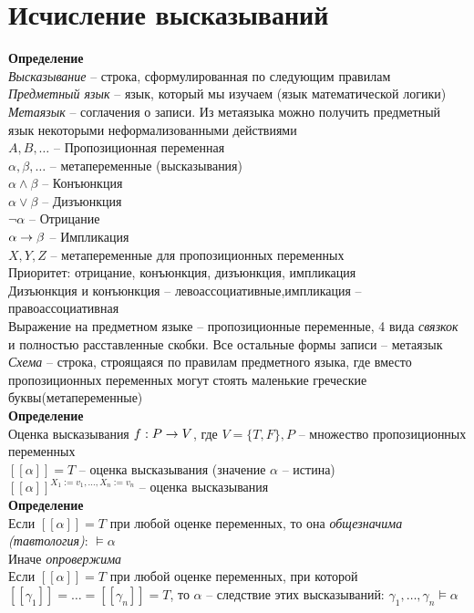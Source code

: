 \documentclass[12pt]{article}
\begin{document}
\section{Исчисление высказываний}
\textbf{Определение}\\
\textit{Высказывание} -- строка, сформулированная по следующим правилам\\
\textit{Предметный язык} -- язык, который мы изучаем (язык математической логики)\\
\textit{Метаязык} -- соглачения о записи. Из метаязыка можно получить предметный язык некоторыми неформализованными действиями\\
$A, B, \ldots$ -- Пропозиционная переменная\\
$\alpha, \beta, \ldots$ -- метапеременные (высказывания)\\
$\alpha \land \beta$ -- Конъюнкция\\
$\alpha \lor \beta$ -- Дизъюнкция\\
$\lnot \alpha$ -- Отрицание\\
$\alpha \rightarrow \beta$ -- Импликация\\
$X, Y, Z$ -- метапеременные для пропозиционных переменных\\
Приоритет: отрицание, конъюнкция, дизъюнкция, импликация\\
Дизъюнкция и конъюнкция -- левоассоциативные,импликация -- правоассоциативная\\
Выражение на предметном языке -- пропозиционные переменные, 4 вида \textit{связкок} и полностью расставленные скобки. Все остальные формы записи -- метаязык\\
\textit{Схема} -- строка, строящаяся по правилам предметного языка, где вместо пропозиционных переменных могут стоять маленькие греческие буквы(метапеременные)\\
\textbf{Определение}\\
Оценка высказывания $f: P \rightarrow V$, где $V=\{T, F\}, P$ -- множество пропозиционных переменных\\
$[[\alpha]] = T$ -- оценка высказывания (значение $\alpha$ -- истина)\\
$[[\alpha]]^{X_1:=v_1, \ldots, X_n:=v_n}$ -- оценка высказывания\\
\textbf{Определение}\\
Если $[[\alpha]] = T$ при любой оценке переменных, то она \textit{общезначима (тавтология)}: $\models \alpha$\\
Иначе \textit{опровержима}\\
Если $[[\alpha]] = T$ при любой оценке переменных, при которой $[[\gamma_1]] = \ldots = [[\gamma_n]] = T$, то $\alpha$ -- следствие этих высказываний: $\gamma_1,\ldots, \gamma_n \models \alpha$\\
\end{document}
